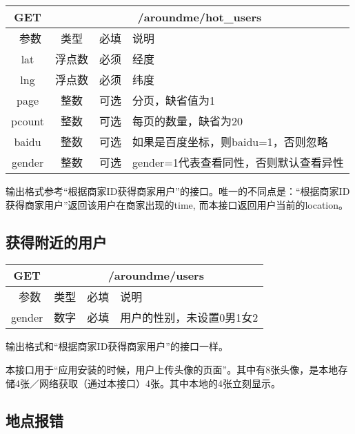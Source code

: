 \documentclass[cs4size]{ctexartutf8}
\begin{document}
\begin{table}[H]
   \begin{center}
\begin{tabular}{|c|c|c|p{12cm}|}
\hline
GET & \multicolumn{3}{|c|}{/aroundme/hot\_users} \\
\hline\hline
 \  参数  & 类型 & 必填 &  说明  \\
\hline
 lat  & 浮点数 & 必须 & 经度\\
\hline
 lng  &  浮点数 & 必须 & 纬度\\ 
  \hline
 page  & 整数 & 可选 & 分页，缺省值为1\\ 
 \hline
 pcount  & 整数 & 可选 & 每页的数量，缺省为20\\ 
\hline
 baidu  & 整数 & 可选 & 如果是百度坐标，则baidu=1，否则忽略\\  
 \hline
 gender  & 整数 & 可选 & gender=1代表查看同性，否则默认查看异性\\  
\hline
\end{tabular}
   \end{center}
\end{table}

输出格式参考“根据商家ID获得商家用户”的接口。唯一的不同点是：“根据商家ID获得商家用户”返回该用户在商家出现的time, 而本接口返回用户当前的location。




\subsection{获得附近的用户}

\begin{table}[H]
   \begin{center}
\begin{tabular}{|c|c|c|p{12cm}|}
\hline
GET & \multicolumn{3}{|c|}{/aroundme/users} \\
\hline\hline
 \  参数  & 类型 & 必填 &  说明  \\
 \hline
 gender  & 数字 & 必填 &  用户的性别，未设置0男1女2\\
\hline
\end{tabular}
   \end{center}
\end{table}

输出格式和“根据商家ID获得商家用户”的接口一样。

本接口用于“应用安装的时候，用户上传头像的页面”。其中有8张头像，是本地存储4张／网络获取（通过本接口）4张。其中本地的4张立刻显示。


\subsection{地点报错}
\end{document}
